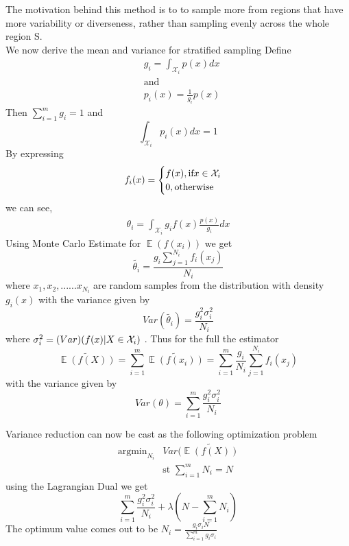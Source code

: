 \documentclass[a4paper,twoside]{iiththesis}
\theoremstyle{definition}
\theoremstyle{definition}
\theoremstyle{remark}
\DeclareMathOperator*{\E}{\mathop{\mathbb{E}}}
\begin{document}
The motivation behind this method is to to sample more from regions that have more variability or diverseness, rather than sampling evenly across the whole region S. \\
We now derive the mean and variance for stratified sampling
Define 
	\begin{align}
	&g_i = \int_{\mathcal{X}_i} p(x) dx \\
    & \text{and} \\
    & p_i(x) = \frac{1}{g_i} p(x)
	\end{align}
    Then $\sum_{i=1}^m g_i =1$ and 
    \begin{equation}
    \int_{\mathcal{X}_i} p_i (x) dx = 1
    \end{equation}
By expressing 
\begin{equation}
f_i(x) = 
\begin{cases}
f(x), \space \text{if} \space x \in \mathcal{X}_i \\ 
				0, \text{otherwise}
\end{cases}
\end{equation}
we can see,
\begin{align}
	\theta_i = \int_{\mathcal{X}_i} g_i f(x) \frac{p(x)}{g_i} dx
\end{align}
Using Monte Carlo Estimate for $\E(f(x_i))$ we get 
\begin{equation}
			\tilde{\theta_i} = \frac{g_i \sum_{j=1}^{N_i} f_i(x_j)} {N_i}
\end{equation}
where $x_1, x_2, ...... x_{N_i}$ are random samples from the distribution with density $g_i(x)$ with the variance given by 
\begin{equation}
	Var(\tilde{\theta_i}) = \frac{g_{i}^2 \sigma_{i}^2} {N_i}
\end{equation}
where $\sigma_{i}^2 = \text(Var) (f(x) | X \in \mathcal{X}_i)$ . Thus for the full the estimator 
\begin{equation}
\tilde{\E(f(X))} = \sum_{i=1}^m \tilde{\E(f(x_i))} = \sum_{i=1}^m \frac{g_i} {N_i} \sum_{j=1}^{N_i} f_i(x_j)
\end{equation}
with the variance given by 
\begin{equation}
Var(\theta) = \sum_{i=1}^m \frac{g_{i}^2 \sigma_{i}^2} {N_i}
\end{equation}

Variance reduction can now be cast as the following optimization problem
\begin{align}
\text{argmin}_{N_i} &Var(\tilde{\E(f(X))}\\
&\text{st } \sum_{i=1}^m N_i = N
\end{align}
using the Lagrangian Dual we get 
\begin{equation}
\sum_{i=1}^m \frac{g_{i}^2 \sigma_{i}^2 } {N_i} + \lambda (N - \sum_{i=1}^m N_i)
\end{equation}
The optimum value comes out to be $N_i = \frac{g_i{\sigma_i}N }{\sum_{i=1}^m g_i{\sigma_i}}$
\end{document}
